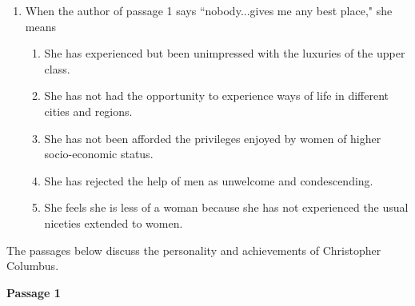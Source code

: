 \documentclass[12pt]{book}
\begin{document}
\begin{enumerate}
\bigskip
\item When the author of passage 1 says ``nobody...gives me any best place," she means
\begin{enumerate}[label=(\Alph*)]
\item She has experienced but been unimpressed with the luxuries of the upper class.
\item She has not had the opportunity to experience ways of life in different cities and regions.
\item She has not been afforded the privileges enjoyed by women of higher socio-economic status.
\item She has rejected the help of men as unwelcome and condescending.
\item She feels she is less of a woman because she has not experienced the usual niceties extended to women.
\end{enumerate}

\end{enumerate}

\bigskip
The passages below discuss the personality and achievements of Christopher Columbus.

\bigskip
\textbf{Passage 1}
\end{document}
